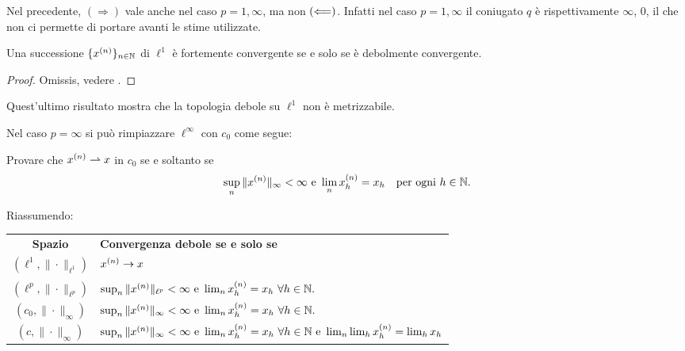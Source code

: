 \begin{remark}
	Nel precedente, $(\Longrightarrow)$ vale anche nel caso $p=1,\infty$, ma non $(\Longleftarrow)$. Infatti nel caso $p=1,\infty$ il coniugato $q$ è rispettivamente $\infty$, $0$, il che non ci permette di portare avanti le stime utilizzate.
\end{remark}

\begin{theorem}
	Una successione $\{x^{(n)}\}_{n \in \mathbb{N}}$ di $\ell^1$ è fortemente convergente se e solo se è debolmente convergente.
\end{theorem}
\begin{proof}
	Omissis, vedere \cite{brezis2010functional}.
\end{proof}

\begin{remark}
	Quest'ultimo risultato mostra che la topologia debole su $\ell^1$ non è metrizzabile.
\end{remark}

\begin{remark}
	Nel caso $p=\infty$ si può rimpiazzare $\ell^\infty$ con $c_0$ come segue:
\end{remark}

\begin{exercise}
	Provare che $x^{(n)} \rightharpoonup x$ in $c_0$ se e soltanto se
	\begin{equation*}
		\sup_n \|x^{(n)}\|_{\infty} < \infty \ \text{e}\ \lim_n x^{(n)}_h = x_h \quad \text{per ogni $h \in \mathbb{N}$}.
	\end{equation*}
\end{exercise}

Riassumendo:

\begin{center}
	\begin{tabular}{cl}
		\textbf{Spazio} & \textbf{Convergenza debole se e solo se}\\
		$(\ell^1, \|\cdot\|_{\ell^1})$ & $x^{(n)} \underset{{}}{\rightarrow} x$\\
		$(\ell^p, \|\cdot\|_{\ell^p})$ & $\sup_n \|x^{(n)}\|_{\ell^p} < \infty \ \text{e}\ \lim_n x^{(n)}_h = x_h \ \forall h \in \N.$\\
		$(c_0, \|\cdot\|_\infty)$ & $\sup_n \|x^{(n)}\|_{\infty} < \infty \ \text{e}\ \lim_n x^{(n)}_h = x_h \ \forall h \in \N.$\\
		$(c, \|\cdot\|_\infty)$ & $\sup_n \|x^{(n)}\|_{\infty} < \infty \ \text{e}\ \lim_n x^{(n)}_h = x_h \ \forall h \in \N \ \text{e}\ \lim_n\lim_h x^{(n)}_h = \lim_h x_h$
	\end{tabular}
\end{center}

